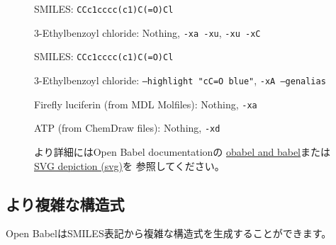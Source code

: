 \documentclass[12pt]{ltjsarticle}
\begin{document}
\begin{figure}[ht]
  \centering
   \hspace{1cm}
   \hspace{1cm}
  \caption{3-Ethylbenzoyl chloride: Nothing, \texttt{-xa -xu}, \texttt{-xu -xC}}
  SMILES: \verb|CCc1cccc(c1)C(=O)Cl|
\end{figure}

\begin{figure}[ht]
  \centering
   \hspace{1cm}
  \caption{3-Ethylbenzoyl chloride: \texttt{--highlight "cC=O blue"}, \texttt{-xA --genalias}}
  SMILES: \verb|CCc1cccc(c1)C(=O)Cl|
\end{figure}

\begin{figure}[ht]
  \centering
   \hspace{1cm}
  \caption{Firefly luciferin (from MDL Molfiles): Nothing, \texttt{-xa}}
\end{figure}

\begin{figure}[ht]
  \centering
   \hspace{1cm}
  \caption{ATP (from ChemDraw files): Nothing, \texttt{-xd}}
\end{figure}

\begin{figure}[ht]
より詳細にはOpen Babel documentationの
\href{http://openbabel.org/docs/dev/Command-line_tools/babel.html}{obabel and babel}または
\href{http://openbabel.org/docs/dev/FileFormats/SVG_2D_depiction.html}{SVG depiction (svg)}を
参照してください。
\end{figure}

\clearpage

\subsection{より複雑な構造式}

Open BabelはSMILES表記から複雑な構造式を生成することができます。
\end{document}
